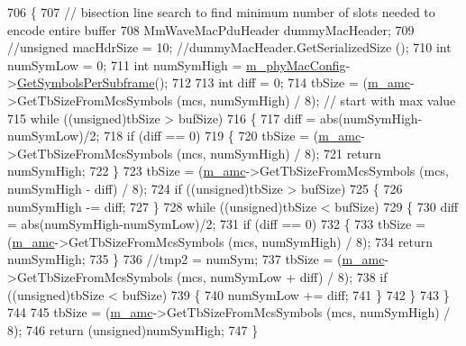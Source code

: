 \begin{DoxyCode}
706 \{
707         \textcolor{comment}{// bisection line search to find minimum number of slots needed to encode entire buffer}
708         MmWaveMacPduHeader dummyMacHeader;
709         \textcolor{comment}{//unsigned macHdrSize = 10; //dummyMacHeader.GetSerializedSize ();}
710         \textcolor{keywordtype}{int} numSymLow = 0;
711         \textcolor{keywordtype}{int} numSymHigh = \hyperlink{classns3_1_1MmWaveMacScheduler_a24d7af4971d2e500fe543cefbafa2fd9}{m\_phyMacConfig}->\hyperlink{classns3_1_1MmWavePhyMacCommon_a2fe835b76e3c689defa413e395cd10cb}{GetSymbolsPerSubframe}();
712 
713         \textcolor{keywordtype}{int} diff = 0;
714         tbSize = (\hyperlink{classns3_1_1MmWaveFlexTtiPfMacScheduler_ab9cf29146f4e3094526de08ffe08b193}{m\_amc}->GetTbSizeFromMcsSymbols (mcs, numSymHigh) / 8); \textcolor{comment}{// start with max value}
715         \textcolor{keywordflow}{while} ((\textcolor{keywordtype}{unsigned})tbSize > bufSize)
716         \{
717                 diff = abs(numSymHigh-numSymLow)/2;
718                 \textcolor{keywordflow}{if} (diff == 0)
719                 \{
720                         tbSize = (\hyperlink{classns3_1_1MmWaveFlexTtiPfMacScheduler_ab9cf29146f4e3094526de08ffe08b193}{m\_amc}->GetTbSizeFromMcsSymbols (mcs, numSymHigh) / 8);
721                         \textcolor{keywordflow}{return} numSymHigh;
722                 \}
723                 tbSize = (\hyperlink{classns3_1_1MmWaveFlexTtiPfMacScheduler_ab9cf29146f4e3094526de08ffe08b193}{m\_amc}->GetTbSizeFromMcsSymbols (mcs, numSymHigh - diff) / 8);
724                 \textcolor{keywordflow}{if} ((\textcolor{keywordtype}{unsigned})tbSize > bufSize)
725                 \{
726                         numSymHigh -= diff;
727                 \}
728                 \textcolor{keywordflow}{while} ((\textcolor{keywordtype}{unsigned})tbSize < bufSize)
729                 \{
730                         diff = abs(numSymHigh-numSymLow)/2;
731                         \textcolor{keywordflow}{if} (diff == 0)
732                         \{
733                                 tbSize = (\hyperlink{classns3_1_1MmWaveFlexTtiPfMacScheduler_ab9cf29146f4e3094526de08ffe08b193}{m\_amc}->GetTbSizeFromMcsSymbols (mcs, numSymHigh) / 8);
734                                 \textcolor{keywordflow}{return} numSymHigh;
735                         \}
736                         \textcolor{comment}{//tmp2 = numSym;}
737                         tbSize = (\hyperlink{classns3_1_1MmWaveFlexTtiPfMacScheduler_ab9cf29146f4e3094526de08ffe08b193}{m\_amc}->GetTbSizeFromMcsSymbols (mcs, numSymLow + diff) / 8);
738                         \textcolor{keywordflow}{if} ((\textcolor{keywordtype}{unsigned})tbSize < bufSize)
739                         \{
740                                 numSymLow += diff;
741                         \}
742                 \}
743         \}
744 
745         tbSize = (\hyperlink{classns3_1_1MmWaveFlexTtiPfMacScheduler_ab9cf29146f4e3094526de08ffe08b193}{m\_amc}->GetTbSizeFromMcsSymbols (mcs, numSymHigh) / 8);
746         \textcolor{keywordflow}{return} (\textcolor{keywordtype}{unsigned})numSymHigh;
747 \}
\end{DoxyCode}


